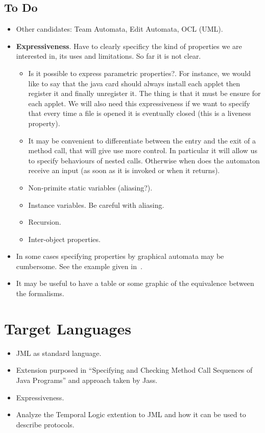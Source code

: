 \documentclass[a4paper,10pt]{article}
\begin{document}
\subsection{To Do}
\begin{itemize}
 \item Other candidates: Team Automata, Edit Automata, OCL (UML).
 \item \textbf{Expressiveness}. Have to clearly specificy the kind of properties
we are interested in, its uses and limitations. So far it is not clear.
  \begin{itemize}
    \item Is it possible to express parametric properties?. For instance, we
would like to say that the java card should always install each applet then
register it and finally unregister it. The thing is that it must be ensure for
each applet. We will also need this expressiveness if we want to specify that
every time a file is opened it is eventually closed (this is a liveness
property).
    \item It may be convenient to differentiate between the entry and the
exit of a method call, that will give use more control. In particular it will
allow us to specify behaviours of nested calls. Otherwise when does the
automaton receive an input (as soon as it is invoked or when it returns).
    \item Non-primite static variables (aliasing?).
    \item Instance variables. Be careful with aliasing.
    \item Recursion.
    \item Inter-object properties.
  \end{itemize}
 \item In some cases specifying properties by graphical automata may be
cumbersome. See the example given in~\cite{Schneider00}.
 \item It may be useful to have a table or some graphic of the equivalence
between the formalisms.
\end{itemize}


\section{Target Languages}\label{sec:Target}
\cite{CheonPeru05}
\begin{itemize}
 \item JML as standard language.
 \item Extension purposed in ``Specifying and Checking Method Call Sequences of
Java Programs'' and approach taken by Jass.
 \item Expressiveness.
 \item Analyze the Temporal Logic extention to JML and how it can be used to
describe protocols.
\end{itemize}
\end{document}

